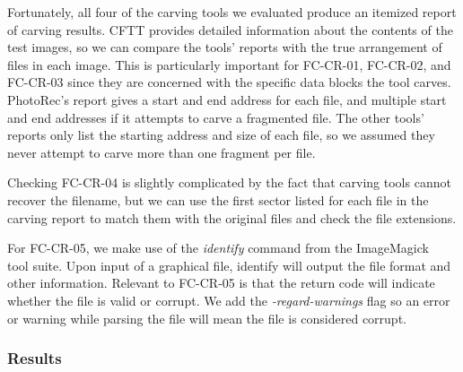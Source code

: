 Fortunately, all four of the carving tools we evaluated produce an itemized report of carving results. CFTT provides detailed information about the contents of the test images, so we can compare the tools' reports with the true arrangement of files in each image. This is particularly important for FC-CR-01, FC-CR-02, and FC-CR-03 since they are concerned with the specific data blocks the tool carves. PhotoRec's report gives a start and end address for each file, and multiple start and end addresses if it attempts to carve a fragmented file. The other tools' reports only list the starting address and size of each file, so we assumed they never attempt to carve more than one fragment per file.

Checking FC-CR-04 is slightly complicated by the fact that carving tools cannot recover the filename, but we can use the first sector listed for each file in the carving report to match them with the original files and check the file extensions.

For FC-CR-05, we make use of the \emph{identify} command from the ImageMagick~\cite{imagemagick} tool suite. Upon input of a graphical file, identify will output the file format and other information. Relevant to FC-CR-05 is that the return code will indicate whether the file is valid or corrupt. We add the \emph{-regard-warnings} flag so an error or warning while parsing the file will mean the file is considered corrupt.

\subsubsection{Results}

